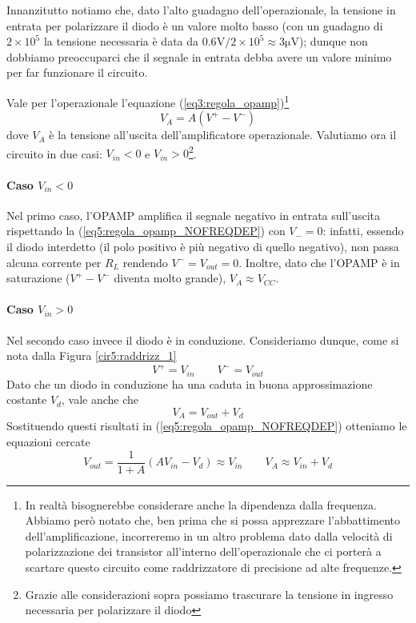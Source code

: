 Innanzitutto notiamo che, dato l'alto guadagno dell'operazionale, la tensione in entrata per polarizzare il diodo è un valore molto basso (con un guadagno di $2\times 10^5$ la tensione necessaria è data da $0.6 \si{\volt}/2\times 10^5 \approx 3 \si{\micro\volt}$); dunque non dobbiamo preoccuparci che il segnale in entrata debba avere un valore minimo per far funzionare il circuito.

Vale per l'operazionale l'equazione (\ref{eq3:regola_opamp})\footnote{In realtà bisognerebbe considerare anche la dipendenza dalla frequenza. Abbiamo però notato che, ben prima che si possa apprezzare l'abbattimento dell'amplificazione, incorreremo in un altro problema dato dalla velocità di polarizzazione dei transistor all'interno dell'operazionale che ci porterà a scartare questo circuito come raddrizzatore di precisione ad alte frequenze.}
\begin{equation}
V_{A}=A (V^+-V^-)
\label{eq5:regola_opamp_NOFREQDEP}
\end{equation}
dove $V_{A}$ è la tensione all'uscita dell'amplificatore operazionale.
Valutiamo ora il circuito in due casi: $V_{in}<0$ e $V_{in}>0$\footnote{Grazie alle considerazioni sopra possiamo trascurare la tensione in ingresso necessaria per polarizzare il diodo}.

\paragraph*{Caso $V_{in}<0$}

Nel primo caso, l'OPAMP amplifica il segnale negativo in entrata sull'uscita rispettando la (\ref{eq5:regola_opamp_NOFREQDEP}) con $V_-=0$: infatti, essendo il diodo interdetto (il polo positivo è più negativo di quello negativo), non passa alcuna corrente per $R_L$ rendendo $V^-=V_{out}=0$. Inoltre, dato che l'OPAMP è in saturazione ($V^+-V^-$ diventa molto grande), $V_A \approx V_{CC}$.

\paragraph*{Caso $V_{in}>0$}

Nel secondo caso invece il diodo è in conduzione. Consideriamo dunque, come si nota dalla Figura \ref{cir5:raddrizz_1}
$$V^+=V_{in} \qquad V^-=V_{out}$$
Dato che un diodo in conduzione ha una caduta in buona approssimazione costante $V_d$, vale anche che
$$V_{A}=V_{out}+V_d$$
Sostituendo questi risultati in (\ref{eq5:regola_opamp_NOFREQDEP}) otteniamo le equazioni cercate
\begin{equation}
V_{out}=\frac{1}{1+A} (A V_{in} - V_d) \approx V_{in} \qquad V_{A} \approx V_{in}+V_d
\label{eq5:leggi_1.1}
\end{equation}

